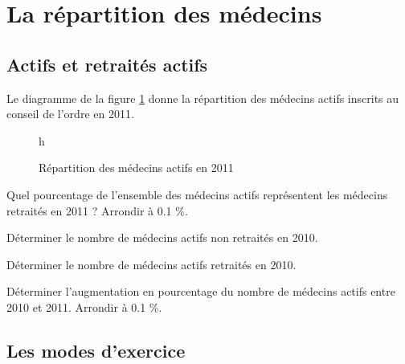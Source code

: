 \section{La répartition des médecins}

\subsection{Actifs et retraités actifs}

Le diagramme de la figure \ref{fig:repartition} donne la répartition des médecins actifs inscrits au conseil de l'ordre en 2011.

\begin{figure}{h}
	\begin{center}
		\caption{Répartition des médecins actifs en 2011}
		\label{fig:repartition}
	\end{center}
\end{figure}


\begin{questions}
	\question Quel pourcentage de l'ensemble des médecins actifs représentent les médecins retraités en 2011 ? Arrondir à \num{0.1} \%.
	
	\question Déterminer le nombre de médecins actifs non retraités en 2010.
	
	\question Déterminer le nombre de médecins actifs retraités en 2010.
	
	\question Déterminer l'augmentation en pourcentage du nombre de médecins actifs entre 2010 et 2011. Arrondir à \num{0.1} \%.
	
\end{questions}

\subsection{Les modes d'exercice}

